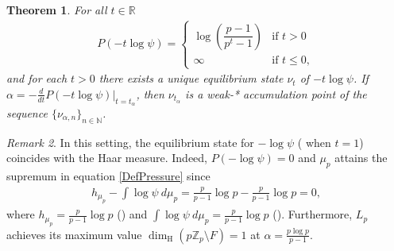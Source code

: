 \documentclass[11pt]{amsart}
\newtheorem{theorem}{Theorem}[section]
\theoremstyle{remark}
\newtheorem{remark}[theorem]{Remark}
\numberwithin{equation}{section}
\newcommand{\N}{\mathbb{N}}
\newcommand{\R}{\mathbb{R}}
\newcommand{\Zp}{\mathbb{Z}_p}
\begin{document}
\begin{theorem}
For all $t\in \R$
\begin{align}\label{TopPressure}
    P(-t\log \psi)=\begin{cases}
        \log\left(\dfrac{p-1}{p^{t}-1}\right) & \text{if $t>0$}\\
        \infty & \text{if $t\leq 0$},
    \end{cases}
\end{align} and for each $t>0$ there exists a unique equilibrium state $\nu_t$ of $-t\log\psi$.  If $\alpha=-\frac{d}{dt}P(-t\log \psi)|_{t=t_{\alpha}}$, then $\nu_{t_\alpha}$ is a weak-* accumulation point of the sequence $\{\nu_{\alpha,n}\}_{n\in \N}$.
\end{theorem}
\begin{remark}\label{Remark1}
In this setting, the equilibrium state for $-\log\psi$ ( when $t=1$) coincides with the Haar measure. Indeed, $P(-\log \psi)=0$ and $\mu_{p}$ attains the supremum in equation \eqref{DefPressure} since
\begin{align}
    h_{\mu_{p}}-\int \log\psi \ d\mu_{p}= \frac{p}{p-1}\log p-\frac{p}{p-1}\log p=0,
\end{align}where $h_{\mu_{p}}=\frac{p}{p-1}\log p$ (\cite[Theorem 1.1]{hn}) and $\int \log\psi \ d\mu_{p}=\frac{p}{p-1}\log p$ (\cite[Theorem 3]{hw}). Furthermore, $L_{p}$ achieves its maximum value $\dim_{\mathrm{H}}(p\Zp\setminus F)=1$ at $\alpha=\frac{p\log p}{p-1}$.
\end{remark}
\end{document}
